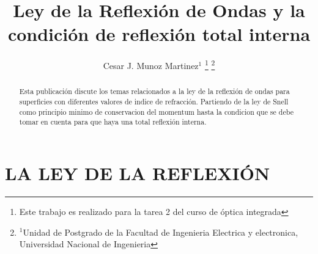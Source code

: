 \documentclass[letterpaper, 10 pt, conference]{ieeeconf}  %
\title{\LARGE \bf
Ley de la Reflexi\'on de Ondas y la condici\'on de reflexi\'on total interna
}
\author{Cesar J. Munoz Martinez$^{1}$%
\thanks{Este trabajo es realizado para la tarea 2 del curso de \'optica integrada}%
\thanks{$^{1}$Unidad de Postgrado de la Facultad de Ingenieria Electrica y electronica,
        Universidad Nacional de Ingenieria}%
}
\begin{document}
\maketitle
\thispagestyle{empty}
\pagestyle{empty}


\begin{abstract}

Esta publicaci\'on discute los temas relacionados a la ley de la reflexi\'on de ondas para superficies con diferentes valores de indice de refracci\'on. Partiendo de la ley de Snell como principio minimo de conservacion del momentum hasta la condicion que se debe tomar en cuenta para que haya una total reflexi\'on interna.

\end{abstract}


\section{LA LEY DE LA REFLEXI\'ON}
\end{document}
